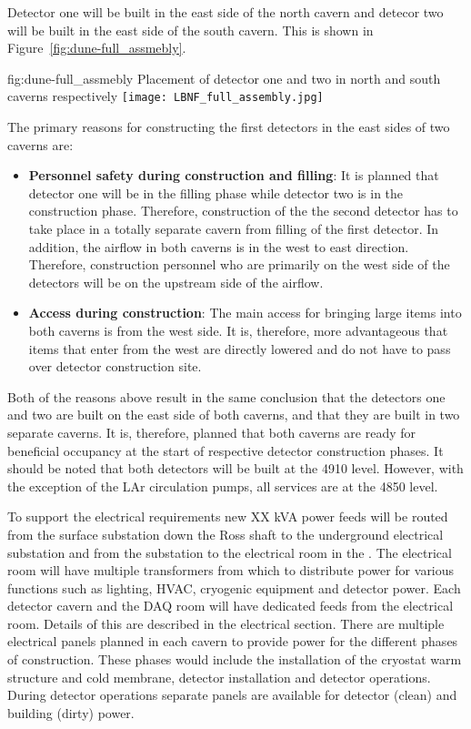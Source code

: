 Detector one will be built in the east side of the north cavern and
detecor two will be built in the east side of the south cavern. This
is shown in Figure~\ref{fig:dune-full_assmebly}.
\begin{dunefigure}{fig:dune-full_assmebly}
  {Placement of detector one and two in north and south caverns respectively}
  \texttt{[image: LBNF\_full\_assembly.jpg]}
\end{dunefigure}
The primary reasons for constructing the first detectors in the east
sides of two caverns are:
\begin{itemize}
\item {\bf Personnel safety during construction and filling}: It is
  planned that detector one will be in the filling phase while detector
  two is in the construction phase. Therefore, construction of the the
  second detector has to take place in a totally separate cavern from
  filling of the first detector. In addition, the airflow in both
  caverns is in the west to east direction. Therefore, construction
  personnel who are primarily on the west side of the detectors will
  be on the upstream side of the airflow.
\item{\bf Access during construction}: The main access for bringing
  large items into both caverns is from the west side. It is,
  therefore, more advantageous that items that enter from the west are
  directly lowered and do not have to pass over detector construction
  site.
\end{itemize}
Both of the reasons above result in the same conclusion that the
detectors one and two are built on the east side of both caverns, and
that they are built in two separate caverns. It is, therefore, planned
that both caverns are ready for beneficial occupancy at the start of
respective detector construction phases.  It should be noted that both
detectors will be built at the 4910 level. However, with the exception
of the LAr circulation pumps, all services are at the 4850 level.

To support the electrical requirements new XX kVA power feeds will be
routed from the surface substation down the Ross shaft to the
underground electrical substation and from the substation to the
electrical room in the .  The electrical room will have multiple
transformers from which to distribute power for various functions such
as lighting, HVAC, cryogenic equipment and detector power.  Each
detector cavern and the DAQ room will have dedicated feeds from the
electrical room.  Details of this are described in the electrical
section.  There are multiple electrical panels planned in each cavern
to provide power for the different phases of construction.  These
phases would include the installation of the cryostat warm structure
and cold membrane, detector installation and detector
operations. During detector operations separate panels are available
for detector (clean) and building (dirty) power.

